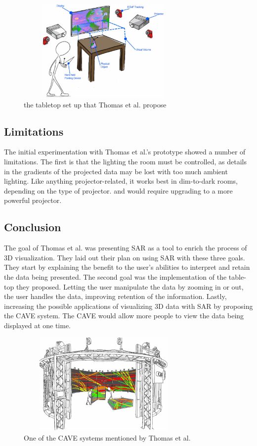 \documentclass{sig-alternate}
\begin{document}
\begin{figure}
	\includegraphics[width=8.5cm, height=5cm]{Tabletop}
	\caption{the tabletop set up that Thomas et al. propose \cite{3D}}
	\label{fig:Tabletop}
\end{figure}

\subsection{Limitations}
\label{sec:Limitations}
The initial experimentation with Thomas et al.'s \cite{3D} prototype showed a number of limitations. The first is that the lighting the room must be controlled, as details in the gradients of the projected data may be lost with too much ambient lighting. Like anything projector-related, it works best in dim-to-dark rooms, depending on the type of projector. and would require upgrading to a more powerful projector.

\subsection{Conclusion}
\label{sec:Conclusion}
The goal of Thomas et al. \cite{3D} was presenting SAR as a tool to enrich the process of 3D visualization. They laid out their plan on using SAR with these three goals. They start by explaining the benefit to the user's abilities to interpret and retain the data being presented. The second goal was the implementation of the table-top they proposed. Letting the user manipulate the data by zooming in or out, the user handles the data, improving retention of the information. Lastly, increasing the possible applications of visualizing 3D data with SAR by proposing the CAVE system. The CAVE would allow more people to view the data being displayed at one time.

\begin{figure}
	\includegraphics[width=8.5cm, height=5cm]{Cave}
	\caption{One of the CAVE systems mentioned by Thomas et al. \cite{3D}}
	\label{fig:Cave}
\end{figure}  
\end{document}
